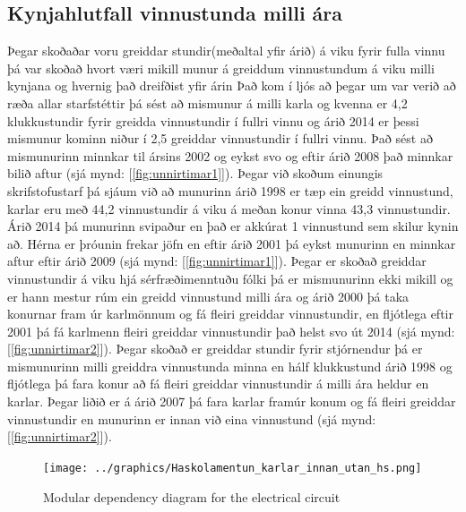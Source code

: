 \documentclass[12pt, git, draft]{rureport}
\begin{document}
\subsection{Kynjahlutfall vinnustunda milli ára}
Þegar skoðaðar voru greiddar stundir(meðaltal yfir árið) á viku fyrir fulla vinnu þá var skoðað hvort væri mikill munur á greiddum vinnustundum á viku milli kynjana og hvernig það dreifðist yfir árin
Það kom í ljós að þegar um var verið að ræða allar starfstéttir þá sést að mismunur á milli karla og kvenna er 4,2 klukkustundir fyrir greidda vinnustundir í fullri vinnu og árið 2014 er þessi mismunur kominn niður í 2,5 greiddar vinnustundir í fullri vinnu.
Það sést að mismunurinn minnkar til ársins 2002 og eykst svo og eftir árið 2008 það minnkar bilið aftur (sjá mynd: [\ref{fig:unnirtimar1}]). 
\newline
\newline
Þegar við skoðum einungis skrifstofustarf þá sjáum við að munurinn árið 1998 er tæp ein greidd vinnustund, karlar eru með 44,2 vinnustundir á viku á meðan konur vinna 43,3 vinnustundir. Árið 2014 þá munurinn svipaður en það er akkúrat 1 vinnustund sem skilur kynin að.
Hérna er þróunin frekar jöfn en eftir árið 2001 þá eykst munurinn en minnkar aftur eftir árið 2009 (sjá mynd: [\ref{fig:unnirtimar1}]).
\newline
\newline
Þegar er skoðað greiddar vinnustundir á viku hjá sérfræðimenntuðu fólki þá er mismunurinn ekki mikill og er hann mestur rúm ein greidd vinnustund milli ára og árið 2000 þá taka konurnar fram úr karlmönnum og fá fleiri greiddar vinnustundir, en fljótlega eftir 2001 þá fá karlmenn fleiri greiddar vinnustundir það helst svo út 2014 (sjá mynd: [\ref{fig:unnirtimar2}]).
\newline
\newline
Þegar skoðað er greiddar stundir fyrir stjórnendur þá er mismunurinn milli greiddra vinnustunda minna en hálf klukkustund árið 1998 og fljótlega þá fara konur að fá fleiri greiddar vinnustundir á milli ára heldur en karlar. Þegar liðið er á árið 2007 þá fara karlar framúr konum og fá fleiri greiddar vinnustundir en munurinn er innan við eina vinnustund (sjá mynd: [\ref{fig:unnirtimar2}]). 

\begin{figure}
	\centering 
	\texttt{[image: ../graphics/Haskolamentun\_karlar\_innan\_utan\_hs.png]}
	\caption{Modular dependency diagram for the electrical circuit \label{fig:menntukarla}}
\end{figure}
\end{document}
